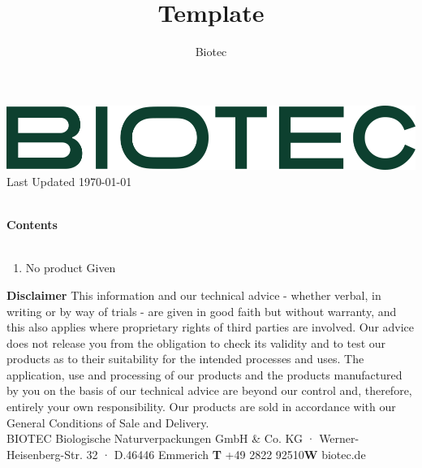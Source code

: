 \documentclass{article}
\title{Template}
\author{Biotec}
\begin{document}
\begin{flushleft}
\includegraphics[scale=0.20]{biotec}
\hfill\tiny Last Updated \today
\end{flushleft}
\begin{flushleft}
\hspace{1cm}\\
\textbf{Contents}\\
\hspace{5in}\\
\begin{enumerate}
\item No product Given\\

\end{enumerate}
\end{flushleft}
\vspace*{\fill}
{\scriptsize
        \textbf{Disclaimer} This information and our technical advice - whether verbal, in writing or by way of trials - are given in good faith but without warranty, and this also applies where proprietary rights of third parties are involved. Our advice does not release you from the obligation to check its validity and to test our products as to their suitability for the intended processes and uses. The application, use and processing of our products and the products manufactured by you on the basis of our technical advice are beyond our control and, therefore, entirely your own responsibility. Our products are sold in accordance with our General Conditions of Sale and Delivery.\\ 
 BIOTEC Biologische Naturverpackungen GmbH \& Co. KG · Werner-Heisenberg-Str. 32 · D.46446 Emmerich \hfill \textbf{T} +49 2822 92510\qquad \textbf{W} biotec.de}
\clearpage
\end{document}
